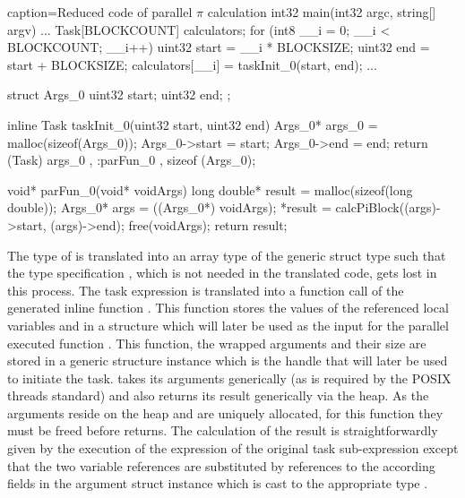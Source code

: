 \begin{ccode}{caption=Reduced code of parallel $\pi$ calculation}
int32 main(int32 argc, string[] argv) {
...
  Task[BLOCKCOUNT] calculators;
  for (int8 __i = 0; __i < BLOCKCOUNT; __i++) { 
    uint32 start = __i * BLOCKSIZE; 
    uint32 end = start + BLOCKSIZE; 
    calculators[__i] = taskInit_0(start, end); 
  }
...
}

struct Args_0 { 
  uint32 start; 
  uint32 end; 
};

inline Task taskInit_0(uint32 start, uint32 end) { 
  Args_0* args_0 = malloc(sizeof(Args_0)); 
  Args_0->start = start; 
  Args_0->end = end; 
  return (Task){ args_0 , :parFun_0 , sizeof (Args_0)}; 
}

void* parFun_0(void* voidArgs) { 
  long double* result = malloc(sizeof(long double)); 
  Args_0* args = ((Args_0*) voidArgs); 
  *result = calcPiBlock((args)->start, (args)->end); 
  free(voidArgs); 
  return result; 
}
\end{ccode}
The type of  is translated into an array type of the generic  struct type such that the type specification , which is not needed in the translated code, gets lost in this process. The task expression  is translated into a function call of the generated inline function . This function stores the values of the referenced local variables  and  in a structure which will later be used as the input for the parallel executed function . This function, the wrapped arguments and their size are stored in a generic  structure instance which is the handle that will later be used to initiate the task.  takes its arguments generically (as is required by the POSIX threads standard) and also returns its result generically via the heap. As the arguments reside on the heap and are uniquely allocated, for this function they must be freed before  returns. The calculation of the result is straightforwardly given by the execution of the expression of the original task sub-expression  except that the two variable references are substituted by references to the according fields in the argument struct instance  which is cast to the appropriate type .
